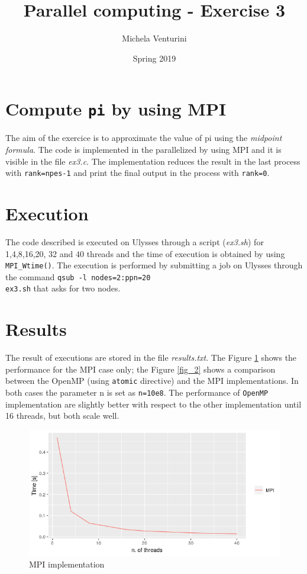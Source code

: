 \documentclass[]{scrartcl}
\title{\textbf{Parallel computing - Exercise 3}}
\author{Michela Venturini}
\date{Spring 2019}
\begin{document}
\maketitle

\section{Compute \texttt{pi} by using MPI}
The aim of the exercice is to approximate the value of pi using the \textit{midpoint formula}. The code is implemented in the parallelized by using MPI and it is visible in the file \textit{ex3.c}. The implementation reduces the result in the last process with \texttt{rank=npes-1} and print the final output in the process with \texttt{rank=0}.

\section{Execution}
The code described is executed on Ulysses through a script (\textit{ex3.sh}) for 1,4,8,16,20, 32 and 40 threads and the time of execution is obtained by using \texttt{MPI\_Wtime()}.
The execution is performed by submitting a job on Ulysses through the command	\colorbox{mygray}{\texttt{qsub -l nodes=2:ppn=20}}\\\colorbox{mygray}{\texttt{ex3.sh}} that asks for two nodes.


\section{Results}
 The result of executions are stored in the file \textit{results.txt}. The Figure \ref{fig_1} shows the performance for the MPI case only; the Figure \ref{fig_2} shows a comparison between the OpenMP (using \texttt{atomic} directive) and the MPI implementations. In both cases the parameter n is set as \texttt{n=10e8}. The performance of \texttt{OpenMP} implementation are slightly better with respect to the other implementation until 16 threads, but both scale well. 
 
 \begin{figure}[h!]
 	\begin{centering}
 		\includegraphics[scale=1]{mpi}
 		\caption{MPI implementation}
 		\label{fig_1}
 	\end{centering}
 \end{figure}
\end{document}

